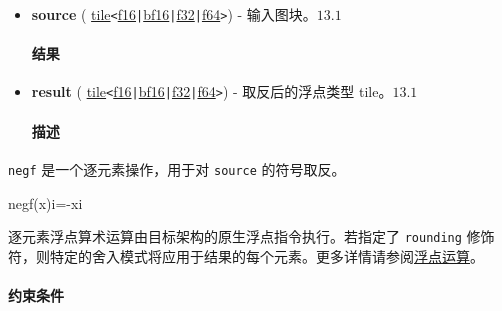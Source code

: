 \documentclass{article}
\begin{document}
\begin{itemize}
\item \textbf{source} ( \href{https://docs.nvidia.com/cuda/tile-ir/latest/sections/types.html#type-tile}{tile}\texttt{<}\href{https://docs.nvidia.com/cuda/tile-ir/latest/sections/types.html#subsection-element-types}{f16}\texttt{|}\href{https://docs.nvidia.com/cuda/tile-ir/latest/sections/types.html#subsection-element-types}{bf16}\texttt{|}\href{https://docs.nvidia.com/cuda/tile-ir/latest/sections/types.html#subsection-element-types}{f32}\texttt{|}\href{https://docs.nvidia.com/cuda/tile-ir/latest/sections/types.html#subsection-element-types}{f64}\texttt{>}) - 输入图块。$\boxed{13.1}$




\paragraph{结果}


\item \textbf{result} ( \href{https://docs.nvidia.com/cuda/tile-ir/latest/sections/types.html#type-tile}{tile}\texttt{<}\href{https://docs.nvidia.com/cuda/tile-ir/latest/sections/types.html#subsection-element-types}{f16}\texttt{|}\href{https://docs.nvidia.com/cuda/tile-ir/latest/sections/types.html#subsection-element-types}{bf16}\texttt{|}\href{https://docs.nvidia.com/cuda/tile-ir/latest/sections/types.html#subsection-element-types}{f32}\texttt{|}\href{https://docs.nvidia.com/cuda/tile-ir/latest/sections/types.html#subsection-element-types}{f64}\texttt{>}) - 取反后的浮点类型 tile。$\boxed{13.1}$




\paragraph{描述}


\end{itemize}
\texttt{negf} 是一个逐元素操作，用于对 \texttt{source} 的符号取反。



negf(x)i=-xi


逐元素浮点算术运算由目标架构的原生浮点指令执行。若指定了 \texttt{rounding} 修饰符，则特定的舍入模式将应用于结果的每个元素。更多详情请参阅\href{https://docs.nvidia.com/cuda/tile-ir/latest/sections/operations.html#op-group-floating-point}{浮点运算}。





\paragraph{约束条件}
\end{document}
